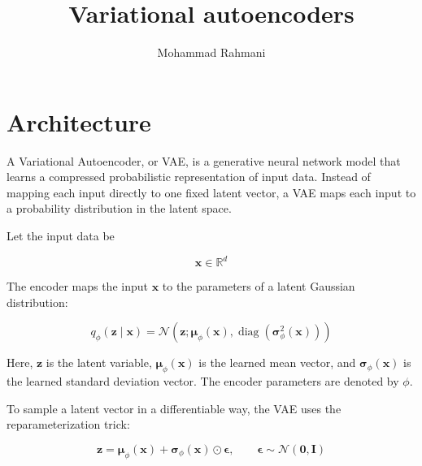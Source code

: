 \documentclass[a4paper]{article}
\title{Variational autoencoders}
\date{}
\author{Mohammad Rahmani}
\begin{document}
    \maketitle
    \cite{kingma-2013-auto-encoding-variational-bayes}
    
    
    \section{Architecture}
        A Variational Autoencoder, or VAE, is a generative neural network model that learns a compressed probabilistic representation of input data. Instead of mapping each input directly to one fixed latent vector, a VAE maps each input to a probability distribution in the latent space.
        
        Let the input data be
        
        \begin{equation}
            \mathbf{x} \in \mathbb{R}^{d}
        \end{equation}
        
        The encoder maps the input $\mathbf{x}$ to the parameters of a latent Gaussian distribution:
        
        \begin{equation}
            q_{\phi}(\mathbf{z} \mid \mathbf{x})
            =
            \mathcal{N}
            \left(
                \mathbf{z};
                \boldsymbol{\mu}_{\phi}(\mathbf{x}),
                \operatorname{diag}
                \left(
                    \boldsymbol{\sigma}_{\phi}^{2}(\mathbf{x})
                \right)
            \right)
        \end{equation}
        
        Here, $\mathbf{z}$ is the latent variable, $\boldsymbol{\mu}_{\phi}(\mathbf{x})$ is the learned mean vector, and $\boldsymbol{\sigma}_{\phi}(\mathbf{x})$ is the learned standard deviation vector. The encoder parameters are denoted by $\phi$.
        
        To sample a latent vector in a differentiable way, the VAE uses the reparameterization trick:
        
        \begin{equation}
            \mathbf{z}
            =
            \boldsymbol{\mu}_{\phi}(\mathbf{x})
            +
            \boldsymbol{\sigma}_{\phi}(\mathbf{x})
            \odot
            \boldsymbol{\epsilon},
            \qquad
            \boldsymbol{\epsilon}
            \sim
            \mathcal{N}
            \left(
                \mathbf{0},
                \mathbf{I}
            \right)
        \end{equation}
        
\end{document}
